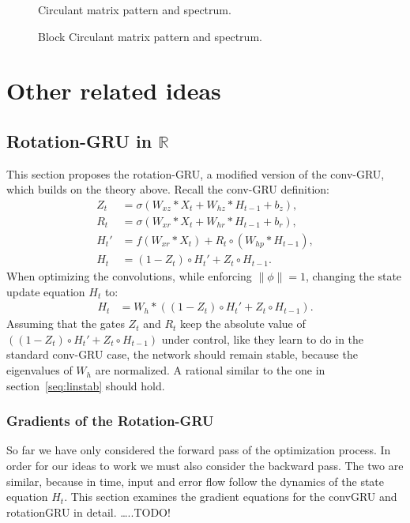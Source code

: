 \documentclass{article}
\begin{document}
\begin{figure}
\centering

% 
\caption{Circulant matrix pattern and spectrum.}
\label{fig:circ_spec2d}
\end{figure} 

\begin{figure}
% 

\caption{Block Circulant matrix pattern and spectrum.}
\label{fig:block_circ_spec2d}
\end{figure}

\section{Other related ideas}
\subsection{Rotation-GRU in $\mathbb{R}$}
This section proposes the rotation-GRU, a modified version of the conv-GRU, which builds on the theory above. Recall the conv-GRU definition:
\begin{align}
Z_t &= \sigma(W_{xz} * X_t + W_{hz} * H_{t-1} + b_z), \\
R_t &= \sigma(W_{xr} * X_t + W_{hr} * H_{t-1} + b_r), \\
H_t' &= f(W_{xr} * X_t) + R_t \circ (W_{hp} * H_{t-1}), \\
H_t &= (1 - Z_t) \circ H_t' + Z_t \circ H_{t-1}.
\end{align}
When optimizing the convolutions, while enforcing $\| \phi \| = 1$, 
changing the state update equation $H_t$ to:
\begin{align}
H_t &= W_h * ((1 - Z_t) \circ H_t' + Z_t \circ H_{t-1}).
\end{align}
Assuming that the gates $Z_t$ and $R_t$ keep the absolute value of 
$((1 - Z_t) \circ H_t' + Z_t \circ H_{t-1})$ under control, like they learn to
do in the standard conv-GRU case, the network should remain stable, because the eigenvalues of $W_h$ are normalized. A rational similar to the one in section~\ref{seq:linstab} should hold.

\subsubsection{Gradients of the Rotation-GRU}
So far we have only considered the forward pass of the optimization process. In order for our ideas to work we must also consider the backward pass. The two are similar, because in time, input and error flow follow the dynamics of the state equation $H_t$. This section examines the gradient equations for the convGRU and rotationGRU in detail. \dots ..TODO!
\end{document}

